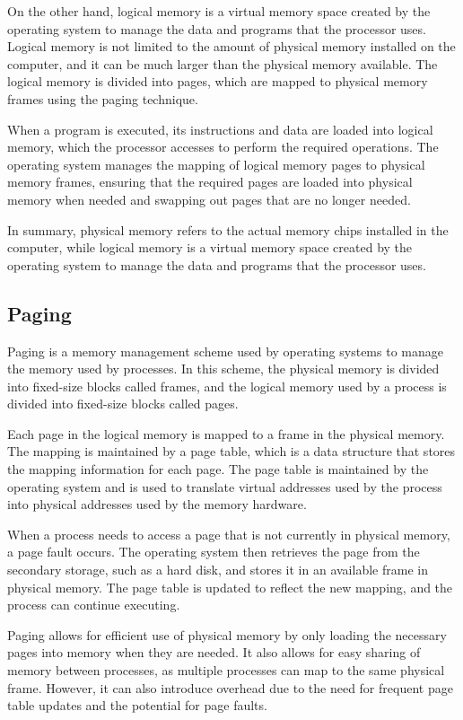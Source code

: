 \documentclass[journal,onecolumn]{IEEEtran}
\begin{document}
On the other hand, logical memory is a virtual memory space created by the operating system to manage the data and programs that the processor uses. Logical memory is not limited to the amount of physical memory installed on the computer, and it can be much larger than the physical memory available. The logical memory is divided into pages, which are mapped to physical memory frames using the paging technique.

When a program is executed, its instructions and data are loaded into logical memory, which the processor accesses to perform the required operations. The operating system manages the mapping of logical memory pages to physical memory frames, ensuring that the required pages are loaded into physical memory when needed and swapping out pages that are no longer needed.

In summary, physical memory refers to the actual memory chips installed in the computer, while logical memory is a virtual memory space created by the operating system to manage the data and programs that the processor uses.

\subsection{Paging}
Paging is a memory management scheme used by operating systems to manage the memory used by processes. In this scheme, the physical memory is divided into fixed-size blocks called frames, and the logical memory used by a process is divided into fixed-size blocks called pages.

Each page in the logical memory is mapped to a frame in the physical memory. The mapping is maintained by a page table, which is a data structure that stores the mapping information for each page. The page table is maintained by the operating system and is used to translate virtual addresses used by the process into physical addresses used by the memory hardware.

When a process needs to access a page that is not currently in physical memory, a page fault occurs. The operating system then retrieves the page from the secondary storage, such as a hard disk, and stores it in an available frame in physical memory. The page table is updated to reflect the new mapping, and the process can continue executing.

Paging allows for efficient use of physical memory by only loading the necessary pages into memory when they are needed. It also allows for easy sharing of memory between processes, as multiple processes can map to the same physical frame. However, it can also introduce overhead due to the need for frequent page table updates and the potential for page faults.
\end{document}
